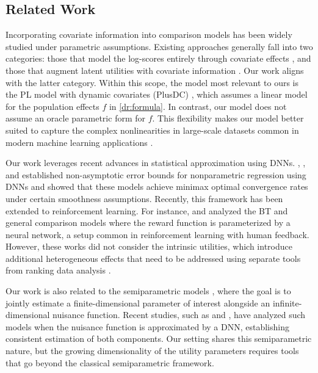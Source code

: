\documentclass[
  12pt]{article}
\begin{document}
\subsection{Related Work} 

Incorporating covariate information into comparison models has been widely studied under parametric assumptions. Existing approaches generally fall into two categories: those that model the log-scores entirely through covariate effects \citep{cattelan2012models,ijcai2018p0304,schafer2018dyad}, and those that augment latent utilities with covariate information \citep{schauberger2019btllasso,li2022bayesian,  fan2024covariate,fan2024uncertainty, dong2025statistical, singh2025least}. Our work aligns with the latter category. Within this scope, the model most relevant to ours is the PL model with dynamic covariates (PlusDC) \citep{dong2025statistical}, which assumes a linear model for the population effects $f$ in \eqref{dr:formula}. In contrast, our model does not assume an oracle parametric form for $f$. This flexibility makes our model better suited to capture the complex nonlinearities in large-scale datasets common in modern machine learning applications \citep{christiano2017deep, ouyang2022training}. 

Our work leverages recent advances in statistical approximation using DNNs.  \citet{schmidt2020nonparametric}, \citet{farrell2021deep}, and \citet{jiao_deepnonparametric} established non-asymptotic error bounds for nonparametric regression using DNNs and showed that these models achieve minimax optimal convergence rates under certain smoothness assumptions. Recently, this framework has been extended to reinforcement learning. For instance, \citet{sun2025rethinking} and \citet{luo2025learningguaranteerewardmodeling} analyzed the BT and general comparison models where the reward function is parameterized by a neural network, a setup common in reinforcement learning with human feedback. However, these works did not consider the intrinsic utilities, which introduce additional heterogeneous effects that need to be addressed using separate tools from ranking data analysis \citep{han2020aoap, han2023general, han2025unifiedanalysis, dong2025statistical}.  

Our work is also related to the semiparametric models \citep{robinson1988root, bickel1993efficient}, where the goal is to 
jointly estimate a finite-dimensional parameter of interest alongside 
an infinite-dimensional nuisance function.   Recent studies, such as \citet{farrell2021deep} and \citet{Hu2025aiasflesh}, have analyzed such models when the nuisance function is approximated by a DNN, establishing consistent estimation of both components. Our setting shares this semiparametric nature, but the growing dimensionality of the utility parameters requires tools that go beyond the classical semiparametric framework.
\end{document}
